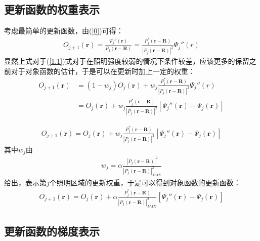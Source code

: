 \documentclass[10pt,aspectratio=169]{beamer} %
\renewcommand{\vec}[1]{\boldsymbol{#1}} %
\begin{document}
\subsection{更新函数的权重表示}

\begin{frame}
    考虑最简单的更新函数，由(\ref{0})可得：
    \begin{align}
        O_{j+1}(\vec{r}) = \frac{\Psi _j''(\vec{r})}{P_j(\vec{r}-\vec{R})} = \frac{P_j^*(\vec{r}-\vec{R})}{|P_j(\vec{r}-\vec{R})|^2} \Psi _j''(r) \label{1.1}
    \end{align}
    显然上式对于(\ref{1.1})式对于在照明强度较弱的情况下条件较差，应该更多的保留之前对于对象函数的估计，于是可以在更新时加上一定的权重：
    \begin{align*}
        O_{j+1}(\vec{r}) & = (1-w_j)O_j(\vec{r}) + w_j \frac{P_j^*(\vec{r}-\vec{R})}{|P_j(\vec{r}-\vec{R})|^2} \Psi _j''(r)                        \\
                         & = O_{j}(\vec{r}) + w_j \frac{P_j^*(\vec{r}-\vec{R})}{|P_j(\vec{r}-\vec{R})|^2}[\Psi _{j}''(\vec{r})-\Psi _{j}(\vec{r})]
    \end{align*}
\end{frame}

\begin{frame}
    \begin{align*}
        O_{j+1}(\vec{r}) = O_{j}(\vec{r}) + w_j \frac{P_j^*(\vec{r}-\vec{R})}{|P_j(\vec{r}-\vec{R})|^2}[\Psi _{j}''(\vec{r})-\Psi _{j}(\vec{r})]
    \end{align*}
    其中$w_j$由
    \begin{align*}
        w_j=\alpha \frac{|P_j(\vec{r}-\vec{R})|^2}{|P_j(\vec{r}-\vec{R})|_{MAX}^2}
    \end{align*}
    给出，表示第$j$个照明区域的更新权重，于是可以得到对象函数的更新函数：
    \begin{align*}
        O_{j+1}(\vec{r}) =O_{j}(\vec{r})+\alpha \frac{P_j^*(\vec{r}-\vec{R})}{|P_j(\vec{r}-\vec{R})|_{MAX}^2}[\Psi _{j}''(\vec{r})-\Psi _{j}(\vec{r})]
    \end{align*}
\end{frame}

\subsection{更新函数的梯度表示}
\end{document}
